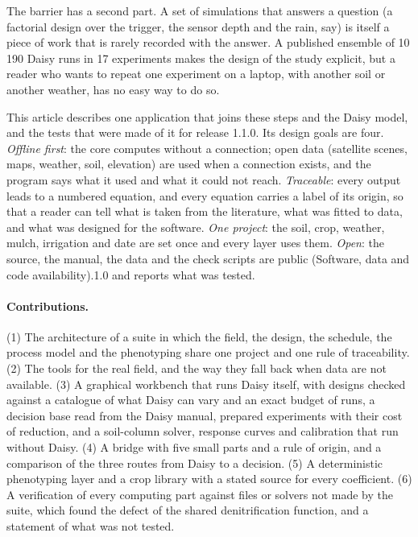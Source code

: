 The barrier has a second part. A set of simulations that answers a question (a factorial design over the trigger, the sensor depth and the rain, say) is itself a piece of work that is rarely recorded with the answer. A published ensemble of 10\,190 Daisy runs in 17 experiments \citep{HaliluData} makes the design of the study explicit, but a reader who wants to repeat one experiment on a laptop, with another soil or another weather, has no easy way to do so.



This article describes one application that joins these steps and the Daisy model, and the tests that were made of it for release 1.1.0. Its design goals are four. \emph{Offline first}: the core computes without a connection; open data (satellite scenes, maps, weather, soil, elevation) are used when a connection exists, and the program says what it used and what it could not reach. \emph{Traceable}: every output leads to a numbered equation, and every equation carries a label of its origin, so that a reader can tell what is taken from the literature, what was fitted to data, and what was designed for the software. \emph{One project}: the soil, crop, weather, mulch, irrigation and date are set once and every layer uses them. \emph{Open}: the source, the manual, the data and the check scripts are public (Software, data and code availability).1.0 and reports what was tested.

\paragraph{Contributions.} (1) The architecture of a suite in which the field, the design, the schedule, the process model and the phenotyping share one project and one rule of traceability. (2) The tools for the real field, and the way they fall back when data are not available. (3) A graphical workbench that runs Daisy itself, with designs checked against a catalogue of what Daisy can vary and an exact budget of runs, a decision base read from the Daisy manual, prepared experiments with their cost of reduction, and a soil-column solver, response curves and calibration that run without Daisy. (4) A bridge with five small parts and a rule of origin, and a comparison of the three routes from Daisy to a decision. (5) A deterministic phenotyping layer and a crop library with a stated source for every coefficient. (6) A verification of every computing part against files or solvers not made by the suite, which found the defect of the shared denitrification function, and a statement of what was not tested.

